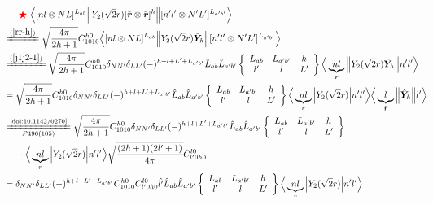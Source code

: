 \documentclass[master]{shnuthesis}
\newcommand{\bmr}{\textbf{\textit{r}}}
\newcommand{\ap}{a^\prime}
\newcommand{\bp}{b^\prime}
\newcommand{\il}{\!\!\!\!\!\!\!\!\!\!}
\newcommand{\zdydh}{\xlongequal}
\newcommand{\redstar}{{\color{red} \bigstar}\,\,}
\begin{document}
\begin{align}
    & \redstar \Big\langle [n l \otimes N L]^{L_{ab}} \Big\| Y_2(\sqrt{2}r) [\hat{\bmr} \otimes \hat{\bmr}]^h \Big\| [n^\prime l^\prime \otimes N^\prime L^\prime]^{L_{\ap\bp}} \Big\rangle \notag\\
    &\il \zdydh{(\ref{rr-h})} \sqrt{\frac{4\pi}{2h+1}}C_{1010}^{h0} \Big\langle [n l \otimes N L]^{L_{ab}} \Big\| Y_2(\sqrt{2}r) \hat{\bm{Y}}_h \Big\| [n^\prime l^\prime \otimes N^\prime L^\prime]^{L_{\ap\bp}} \Big\rangle \\
    &\il \zdydh{(\ref{j1j2-1})} \sqrt{\frac{4\pi}{2h+1}}C_{1010}^{h0} \delta_{NN^\prime}\delta_{LL^\prime}(-)^{h+l+L^\prime+L_{\ap\bp}}\hat{L}_{ab}\hat{L}_{\ap\bp}  \left\{\begin{array}{ccc} L_{ab} & L_{\ap\bp} & h \\ l^\prime & l & L^\prime \end{array}\right\}  \Big\langle \underbrace{n l}_{\bmr} \Big\| Y_2(\sqrt{2}r) \hat{\bm{Y}}_h \Big\| n^\prime l^\prime \Big\rangle \\
    &\il = \sqrt{\frac{4\pi}{2h+1}}C_{1010}^{h0} \delta_{NN^\prime}\delta_{LL^\prime}(-)^{h+l+L^\prime+L_{\ap\bp}}\hat{L}_{ab}\hat{L}_{\ap\bp}  \left\{\begin{array}{ccc} L_{ab} & L_{\ap\bp} & h \\ l^\prime & l & L^\prime \end{array}\right\}  \Big\langle \underbrace{n l}_{r} \Big| Y_2(\sqrt{2}r) \Big| n^\prime l^\prime \Big\rangle \Big\langle \underbrace{l}_{\hat{\bmr}} \Big\| \hat{\bm{Y}}_h \Big\| l^\prime \Big\rangle \\
    &\il \zdydh[P496(105)]{\text{\cite{doi:10.1142/0270}}} \sqrt{\frac{4\pi}{2h+1}}C_{1010}^{h0} \delta_{NN^\prime}\delta_{LL^\prime}(-)^{h+l+L^\prime+L_{\ap\bp}}\hat{L}_{ab}\hat{L}_{\ap\bp}  \left\{\begin{array}{ccc} L_{ab} & L_{\ap\bp} & h \\ l^\prime & l & L^\prime \end{array}\right\}  \notag\\
    & \cdot \Big\langle \underbrace{n l}_{r} \Big| Y_2(\sqrt{2}r) \Big| n^\prime l^\prime \Big\rangle \sqrt{\frac{(2h+1)(2l^\prime+1)}{4\pi}} C_{l^\prime 0 h 0}^{l0} \\
    &\il = \delta_{NN^\prime}\delta_{LL^\prime}(-)^{h+l+L^\prime+L_{\ap\bp}}C_{1010}^{h0}C_{l^\prime 0 h 0}^{l0} \hat{l^\prime}\hat{L}_{ab}\hat{L}_{\ap\bp}  \left\{\begin{array}{ccc} L_{ab} & L_{\ap\bp} & h \\ l^\prime & l & L^\prime \end{array}\right\}  \Big\langle \underbrace{n l}_{r} \Big| Y_2(\sqrt{2}r) \Big| n^\prime l^\prime \Big\rangle \label{lL-Y2-rrh}
\end{align}
\end{document}
